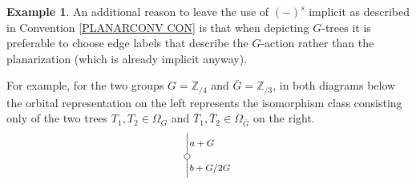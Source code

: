 \documentclass[a4paper,10pt
,draft
]{article}%
\numberwithin{equation}{section}
\numberwithin{figure}{section}
\theoremstyle{definition} %
\newtheorem{example}[equation]{Example}%
\newcommand{\1}{\ensuremath{\mathbbm 1}}%
\begin{document}
\begin{example}
An additional reason to leave the use of $(\minus)^s$ implicit
as described in Convention \ref{PLANARCONV CON} is that when depicting $G$-trees it is preferable to choose edge labels that describe the $G$-action rather than the planarization (which is already implicit anyway).

For example, for the two groups 
$G = \mathbb{Z}_{/4}$ and 
$\bar{G} = \mathbb{Z}_{/3}$, in both diagrams below the orbital representation on the left represents the isomorphism class consisting only of the two trees 
$T_1,T_2 \in \Omega_G$ and
$\bar{T}_1,\bar{T}_2 \in \Omega_{\bar{G}}$
on the right.
\[
	\begin{tikzpicture}[grow=up,auto,level distance=2.1em,
	every node/.style = {font=\footnotesize,inner sep=2pt},
	dummy/.style={circle,draw,inner sep=0pt,minimum size=1.75mm}]
%
		\node at (-1,-2) {}
			child{node [dummy] {}
				child[sibling distance=1.75em]{
				edge from parent node [swap]  {$a+G$}}
			edge from parent node [swap] {$b+G/2G$}};

\end{tikzpicture}\]
\end{example}
\end{document}
